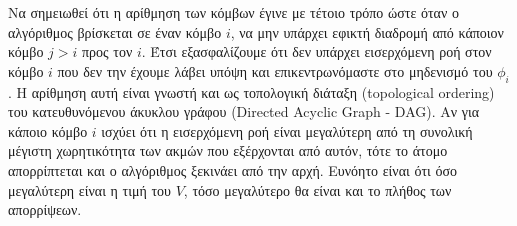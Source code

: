 \documentclass[a4paper,12pt]{article}
\begin{document}
Να σημειωθεί ότι η αρίθμηση των κόμβων έγινε με τέτοιο τρόπο ώστε όταν ο αλγόριθμος βρίσκεται σε έναν κόμβο $i$, 
να μην υπάρχει εφικτή διαδρομή από κάποιον κόμβο $j > i$ προς τον $i$. Έτσι εξασφαλίζουμε ότι δεν 
υπάρχει εισερχόμενη ροή στον κόμβο $i$ που δεν την έχουμε λάβει υπόψη και επικεντρωνόμαστε στο μηδενισμό του 
$\phi_i$. Η αρίθμηση αυτή είναι γνωστή και ως τοπολογική διάταξη (topological
ordering) του κατευθυνόμενου άκυκλου γράφου
(Directed Acyclic Graph - DAG). Αν για κάποιο κόμβο $i$ ισχύει ότι η εισερχόμενη ροή είναι 
μεγαλύτερη από τη συνολική μέγιστη χωρητικότητα των ακμών που εξέρχονται από αυτόν, τότε το άτομο απορρίπτεται 
και ο αλγόριθμος ξεκινάει από την αρχή. Ευνόητο είναι ότι όσο μεγαλύτερη είναι η τιμή του $V$, τόσο μεγαλύτερο θα 
είναι και το πλήθος των απορρίψεων.
\end{document}
